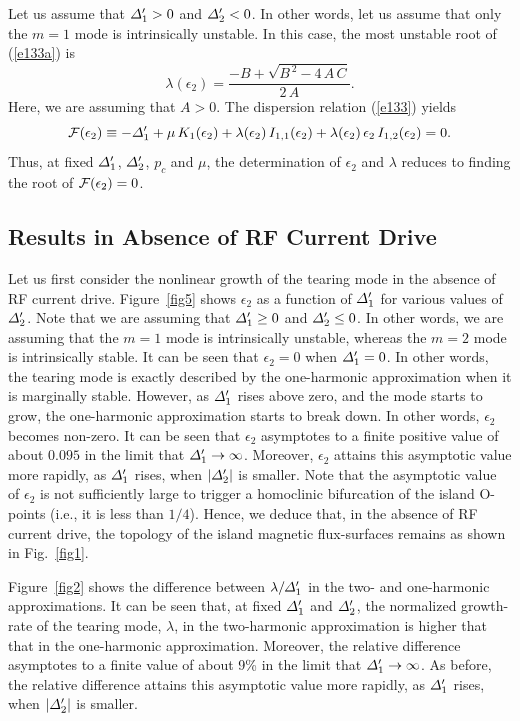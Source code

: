 \documentclass[12pt,prb,aps]{revtex4-1}
\begin{document}
Let us assume that ${\mit\Delta}_1'>0$ and ${\mit\Delta}_2'< 0$. In other words, let us assume that only the
$m=1$ mode is intrinsically unstable. In this case, the most unstable root of (\ref{e133a}) is
\begin{equation}
\lambda(\epsilon_2) = \frac{-B +\sqrt{B^{\,2}-4\,A\,C}}{2\,A}.
\end{equation}
Here, we are assuming that $A>0$. The dispersion relation (\ref{e133})  yields
\begin{equation}
{\cal F}(\epsilon_2)\equiv -{\mit\Delta}_1'+\mu\,K_1(\epsilon_2)+\lambda(\epsilon_2)\,I_{1,1}(\epsilon_2)+\lambda(\epsilon_2)\,\epsilon_2\,I_{1,2}(\epsilon_2) = 0.
\end{equation}
Thus, at fixed ${\mit\Delta}_1'$, ${\mit\Delta}_2'$, $p_c$ and $\mu$, the determination of $\epsilon_2$ and $\lambda$ reduces to finding the root of ${\cal F}(\epsilon_2)=0$. 

\subsection{Results in Absence of RF Current Drive}
Let us first consider the nonlinear growth of the tearing mode in the absence of RF current drive. Figure~\ref{fig5}
shows $\epsilon_2$ as a function of ${\mit\Delta}_1'$ for various values of
${\mit\Delta}_2'$. Note that we are assuming that ${\mit\Delta}_1'\geq 0$ and ${\mit\Delta}_2'\leq 0$. In other words, we are assuming  that
the $m=1$ mode is intrinsically unstable, whereas the $m=2$ mode is intrinsically stable. It can be seen that $\epsilon_2=0$
when ${\mit\Delta}_1'=0$. In other words, the tearing mode is exactly described by the one-harmonic approximation
when it is marginally stable. However, as ${\mit\Delta}_1'$ rises above zero, and the mode starts to grow, the one-harmonic approximation starts to break down. In other words, $\epsilon_2$ becomes non-zero. It can be seen that $\epsilon_2$ asymptotes to a finite positive value of about $0.095$ in the limit that 
${\mit\Delta}_1'\rightarrow \infty$. Moreover, $\epsilon_2$ attains this asymptotic value more rapidly, as ${\mit\Delta}_1'$ rises, 
when $|{\mit\Delta}_2'|$ is smaller. 
Note that the asymptotic value of $\epsilon_2$ is not 
sufficiently large  to trigger a homoclinic bifurcation of the island O-points (i.e., it is less than $1/4$). Hence, we deduce that, in the absence of RF current drive,  the topology of the island
magnetic flux-surfaces remains as shown in Fig.~\ref{fig1}. 

Figure~\ref{fig2} shows the
difference between $\lambda/{\mit\Delta}_1'$ in the two- and one-harmonic approximations. It can be seen that, at fixed ${\mit\Delta}_1'$ and ${\mit\Delta}_2'$, the
normalized growth-rate of the tearing mode, $\lambda$,  in the two-harmonic approximation is higher that that in the one-harmonic
approximation. Moreover, the relative difference asymptotes to a finite value of about 9\% in the limit that 
${\mit\Delta}_1'\rightarrow \infty$. As before,  the relative difference attains this asymptotic value more rapidly, as ${\mit\Delta}_1'$ rises, 
when $|{\mit\Delta}_2'|$ is smaller. 
\end{document}
